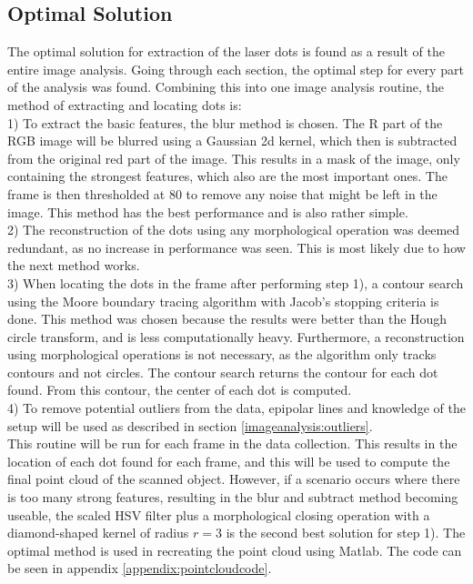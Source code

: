 \subsection{Optimal Solution}
The optimal solution for extraction of the laser dots is found as a result of the entire image analysis. Going through each section, the optimal step for every part of the analysis was found. Combining this into one image analysis routine, the method of extracting and locating dots is:\\

1) To extract the basic features, the blur method is chosen. The R part of the RGB image will be blurred using a Gaussian 2d kernel, which then is subtracted from the original red part of the image. This results in a mask of the image, only containing the strongest features, which also are the most important ones. The frame is then thresholded at 80 to remove any noise that might be left in the image. This method has the best performance and is also rather simple.\\

2) The reconstruction of the dots using any morphological operation was deemed redundant, as no increase in performance was seen. This is most likely due to how the next method works.\\

3) When locating the dots in the frame after performing step 1), a contour search using the Moore boundary tracing algorithm with Jacob's stopping criteria is done. This method was chosen because the results were better than the Hough circle transform, and is less computationally heavy. Furthermore, a reconstruction using morphological operations is not necessary, as the algorithm only tracks contours and not circles. The contour search returns the contour for each dot found. From this contour, the center of each dot is computed.\\

4) To remove potential outliers from the data, epipolar lines and knowledge of the setup will be used as described in section \ref{imageanalysis:outliers}.\\


This routine will be run for each frame in the data collection. This results in the location of each dot found for each frame, and this will be used to compute the final point cloud of the scanned object. However, if a scenario occurs where there is too many strong features, resulting in the blur and subtract method becoming useable, the scaled HSV filter plus a morphological closing operation with a diamond-shaped kernel of radius $r=3$ is the second best solution for step 1).  The optimal method is used in recreating the point cloud using Matlab. The code can be seen in appendix \ref{appendix:pointcloudcode}.

\clearpage
